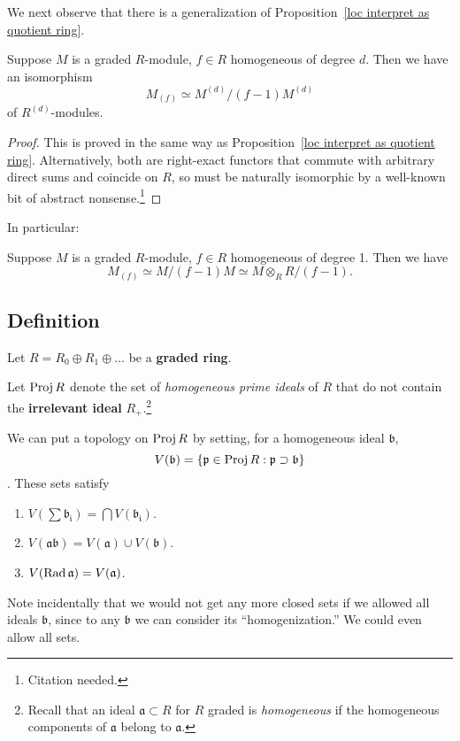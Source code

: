 We next observe that there is a generalization of Proposition~\ref{loc interpret as quotient ring}.
\begin{proposition} \label{loc
module as quotient}
Suppose $M$ is a graded $R$-module, $f \in R$ homogeneous of degree $d$. Then
we have an isomorphism
\[ M_{(f)} \simeq M^{(d)}/(f-1)M^{(d)}  \]
of $R^{(d)}$-modules.
\end{proposition}
\begin{proof} 
This is proved in the same way as Proposition~\ref{loc interpret as quotient
ring}. Alternatively, both are right-exact functors that commute with
arbitrary direct sums and coincide on $R$, so must be naturally isomorphic by
a well-known bit of abstract nonsense.\footnote{Citation needed.} 
\end{proof} 

In particular:
\begin{corollary} 
Suppose $M$ is a graded $R$-module, $f \in R$ homogeneous of degree 1. Then we
have
\[  M_{(f)} \simeq M/(f-1)M \simeq M\otimes_R R/(f-1).  \]
\end{corollary} 
\subsection{Definition}
Let $R=R_0 \oplus R_1 \oplus \dots$ be a \textbf{graded ring}.

\begin{definition} 
Let $\operatorname{Proj} R$ denote the set of \emph{homogeneous prime ideals} of
$R$ that do not contain the \textbf{irrelevant ideal} $R_+$.\footnote{Recall that an ideal $\mathfrak{a} \subset R$ for $R$ graded is
\emph{homogeneous} if the homogeneous components of $\mathfrak{a}$ belong to
$\mathfrak{a}$.}

\end{definition} 

We can put a topology on $\operatorname{Proj} R$ by setting, for a homogeneous ideal
$\mathfrak{b}$, $$V(\mathfrak{b}) = \{ \mathfrak{p} \in \operatorname{Proj} R:
\mathfrak{p} \supset \mathfrak{b}\}$$.  These sets satisfy
\begin{enumerate}
\item $V( \sum \mathfrak{b_i}) = \bigcap V(\mathfrak{b_i})$.
\item  $V( \mathfrak{a}\mathfrak{b}) = V(\mathfrak{a}) \cup V(\mathfrak{b})$.
\item  $V( \operatorname{Rad} \mathfrak{a}) = V(\mathfrak{a})$.
\end{enumerate}
Note incidentally that we would not get any more closed sets if we allowed all
ideals $\mathfrak{b}$, since to any $\mathfrak{b}$ we can consider its ``homogenization.''
We could even allow all sets.

